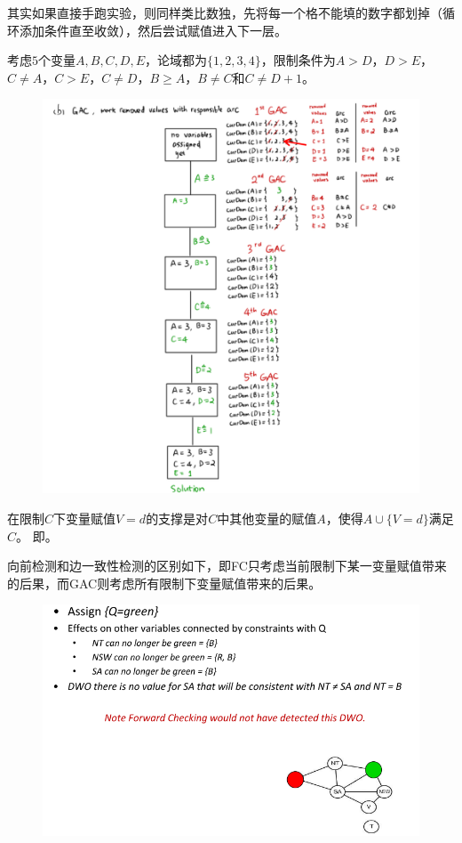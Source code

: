 其实如果直接手跑实验，则同样类比数独，先将每一个格不能填的数字都划掉（循环添加条件直至收敛），然后尝试赋值进入下一层。
\begin{example}
考虑$5$个变量$A,B,C,D,E$，论域都为$\{1,2,3,4\}$，限制条件为$A > D$，$D > E$，$C \ne A$，$C > E$，$C \ne D$，$B \geq A$，$B \ne C$和$C \ne D + 1$。
\end{example}
\begin{analysis}
\begin{figure}[H]
\centering
\includegraphics[width=0.7\linewidth]{fig/T02-2.png}
\end{figure}
\end{analysis}

\begin{definition}[支撑]
在限制$C$下变量赋值$V=d$的支撑是对$C$中其他变量的赋值$A$，使得$A\cup\{V=d\}$满足$C$。
即。
\end{definition}

向前检测和边一致性检测的区别如下，即FC只考虑当前限制下某一变量赋值带来的后果，而GAC则考虑所有限制下变量赋值带来的后果。
\begin{figure}[H]
\centering
\includegraphics[width=0.8\linewidth]{fig/diff_fc_gac.png}
\end{figure}